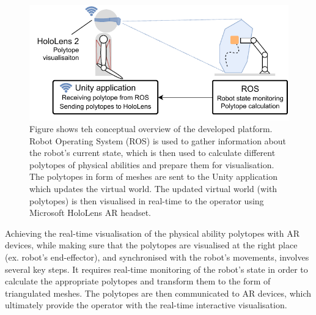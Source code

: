 \begin{figure}[!h]
    \centering
    \includegraphics[width=0.8\linewidth]{Papers/images/unity_visualisation.pdf}
    \caption{Figure shows teh conceptual overview of the developed platform. Robot Operating System (ROS) is used to gather information about the robot's current state, which is then used to calculate different polytopes of physical abilities and prepare them for visualisation. The polytopes in form of meshes are sent to the Unity application which updates the virtual world. The updated virtual world (with polytopes) is then visualised in real-time to the operator using Microsoft HoloLens AR headset.}
    \label{fig:unity_visual}
\end{figure}



Achieving the real-time visualisation of the physical ability polytopes with AR devices, while making sure that the polytopes are visualised at the right place (ex. robot's end-effector), and synchronised with the robot's movements, involves several key steps. It requires real-time monitoring of the robot's state in order to calculate the appropriate polytopes and transform them to the form of triangulated meshes. The polytopes are then communicated to AR devices, which ultimately provide the operator with the real-time interactive visualisation. 


